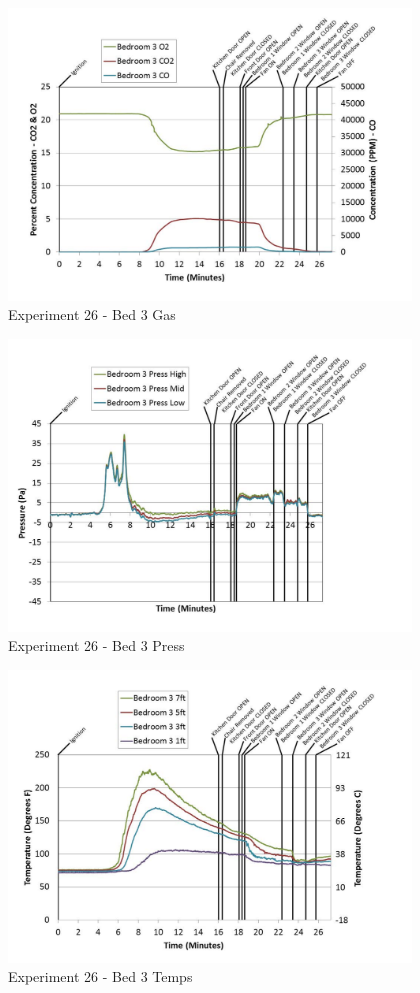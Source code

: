 \documentclass{article}
\begin{document}
\begin{appendices}
	\begin{figure}[h!]
		\centering
		\includegraphics[height=3.05in]{0_Images/Results_Charts/Exp_26_Charts/Bed3Gas.pdf}
		\caption{Experiment 26 - Bed 3 Gas}
	\end{figure}
 
	\clearpage

	\begin{figure}[h!]
		\centering
		\includegraphics[height=3.05in]{0_Images/Results_Charts/Exp_26_Charts/Bed3Press.pdf}
		\caption{Experiment 26 - Bed 3 Press}
	\end{figure}
 

	\begin{figure}[h!]
		\centering
		\includegraphics[height=3.05in]{0_Images/Results_Charts/Exp_26_Charts/Bed3Temps.pdf}
		\caption{Experiment 26 - Bed 3 Temps}
	\end{figure}
 

\end{appendices}
\end{document}
